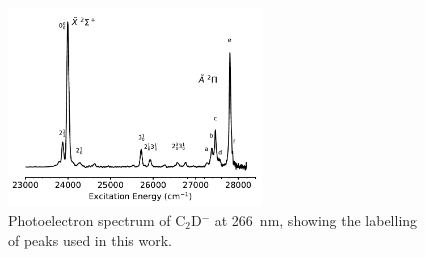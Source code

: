 \documentclass[journal=jacsat,manuscript=suppinfo]{achemso}
\begin{document}
\begin{figure}[th!]
	\includegraphics[width=0.6\textwidth]{figures/FigS2.pdf}
	\caption{Photoelectron spectrum of C$_2$D$^-$ at 266~nm, showing the labelling of peaks used in this work.}
	\label{fig:2}
\end{figure}
\end{document}
